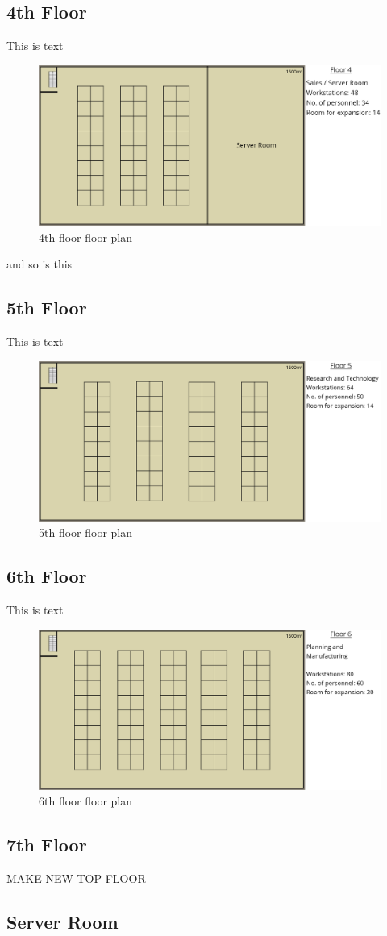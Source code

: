 \subsection{4th Floor}
This is text
\begin{figure}[h]
    \includegraphics[width=15cm]{Figures/4th-Floor.png}
    \caption{4th floor floor plan}
    \label{4th_floor}
\end{figure}
and so is this
\subsection{5th Floor}
This is text
\begin{figure}[h]
    \includegraphics[width=15cm]{Figures/5th-Floor.png}
    \caption{5th floor floor plan}
    \label{5th_floor}
\end{figure}
\subsection{6th Floor}
This is text
\begin{figure}[h]
    \includegraphics[width=15cm]{Figures/6th-Floor.png}
    \caption{6th floor floor plan}
    \label{6th_floor}
\end{figure}
\subsection{7th Floor}
\begin{huge}
    MAKE NEW TOP FLOOR
\end{huge}
\subsection{Server Room}